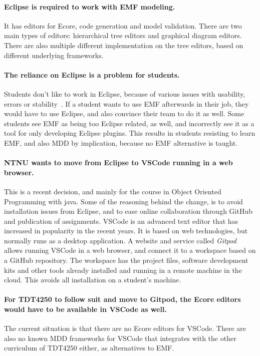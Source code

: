\paragraph{\Gls{Eclipse} is required to work with \acrshort{EMF} modeling.}
It has editors for \gls{Ecore}, code generation and model validation.
There are two main types of editors: hierarchical tree editors and graphical diagram editors.
There are also multiple different implementation on the tree editors, based on different underlying frameworks.

\paragraph{The reliance on \gls{Eclipse} is a problem for students.}
Students don't like to work in Eclipse, because of various issues with usability, errors or stability~\cite{rekstadModelingEnvironmentCloud2020}.
If a student wants to use \acrshort{EMF} afterwards in their job, they would have to use \gls{Eclipse}, and also convince their team to do it as well.
Some students see \acrshort{EMF} as being too \gls{Eclipse} related, as well, and incorrectly see it as a tool for only developing Eclipse plugins.
This results in students resisting to learn \acrshort{EMF}, and also \acrshort{MDD} by implication, because no \acrshort{EMF} alternative is taught.

\paragraph{\acrshort{NTNU} wants to move from \gls{Eclipse} to \gls{VSCode} running in a web browser.}
This is a recent decision, and mainly for the course in Object Oriented Programming with java.
Some of the reasoning behind the change, is to avoid installation issues from \gls{Eclipse}, and to ease online collaboration through \gls{GitHub} and publication of assignments. %
\gls{VSCode} is an advanced text editor that has increased in popularity in the recent years.
It is based on web technologies, but normally runs as a desktop application.
A website and service called \textit{\gls{Gitpod}} allows running \gls{VSCode} in a web browser, and connect it to a workspace based on a \gls{GitHub} repository.
The workspace has the project files, software development kits and other tools already installed and running in a remote machine in the \gls{cloud}.
This avoids all installation on a student's machine.

\paragraph{For \gls{TDT4250} to follow suit and move to \gls{Gitpod}, the \gls{Ecore} editors would have to be available in \gls{VSCode} as well.}
The current situation is that there are no \gls{Ecore} editors for \gls{VSCode}.
There are also no known \acrshort{MDD} frameworks for \gls{VSCode} that integrates with the other curriculum of \gls{TDT4250} either, as alternatives to \acrshort{EMF}.


